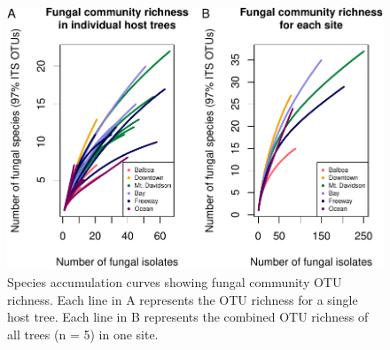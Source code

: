 \documentclass[fleqn,10pt,lineno]{wlpeerj} %
\begin{document}
\begin{figure}
\centering
\includegraphics{gibson2023_files/figure-latex/rarefaction-plot-1.pdf}
\caption{\label{fig:rarefaction-plot}Species accumulation curves showing fungal community OTU richness. Each line in A represents the OTU richness for a single host tree. Each line in B represents the combined OTU richness of all trees (n = 5) in one site.}
\end{figure}
\end{document}
